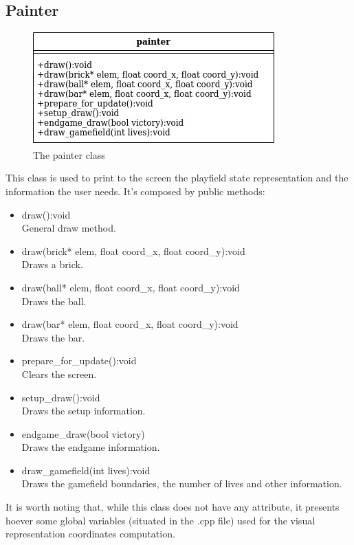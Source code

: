 \documentclass[]{article}
\begin{document}
\subsection{Painter}
\begin{figure}[h!]
    \centering
    \includegraphics[scale=0.5]{painter.jpg}
    \caption{The painter class}
    \label{fig:painter class diagram }
\end{figure}
This class is used to print to the screen the playfield state representation and the information the user needs. It's composed by public methods:
\begin{itemize}
		\item draw():void \\ General draw method.
		\item draw(brick* elem, float coord\_x, float coord\_y):void\\ Draws a brick.
		\item draw(ball* elem, float coord\_x, float coord\_y):void\\ Draws the ball.
		\item draw(bar* elem, float coord\_x, float coord\_y):void\\ Draws the bar.
		\item prepare\_for\_update():void\\ Clears the screen.
		\item setup\_draw():void\\Draws the setup information.
		\item endgame\_draw(bool victory)\\Draws the endgame information.
		\item draw\_gamefield(int lives):void\\Draws the gamefield boundaries, the number of lives and other information.
	\end{itemize}
It is worth noting that, while this class does not have any attribute, it presents hoever some global variables (situated in the .cpp file) used for the visual representation coordinates computation.
\newpage
\end{document}
